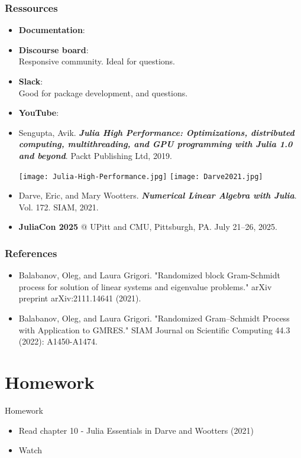 \documentclass[t,usepdftitle=false]{beamer}
\begin{document}
\begin{frame}
\frametitle{Ressources}
\begin{itemize}
\item \textbf{Documentation}: \href{docs.julialang.org}{\color{blue}{docs.julialang.org}}
\item \textbf{Discourse board}: \href{discourse.julialang.org}{\color{blue}{discourse.julialang.org}}\\
\hspace{3.1cm}Responsive community. Ideal for questions.
\item \textbf{Slack}: \href{julialang.slack.com}{\color{blue}{julialang.slack.com}}\\
\hspace{1.2cm}Good for package development, and questions.
\item \textbf{YouTube}: \href{www.youtube.com/c/TheJuliaLanguage}{\color{blue}{www.youtube.com/c/TheJuliaLanguage}}
\item Sengupta, Avik. \textit{\textbf{Julia High Performance: Optimizations, distributed computing,
multithreading, and GPU programming with Julia 1.0 and beyond}}. Packt Publishing Ltd,
2019.\vspace{.1cm}
\begin{center}
\raisebox{.75cm}{My favorite}\hspace{.2cm}
\texttt{[image: Julia-High-Performance.jpg]}
\hspace{1cm}
\texttt{[image: Darve2021.jpg]}
\hspace{.2cm}\raisebox{.75cm}{Used at Stanford}
\end{center}
\item Darve, Eric, and Mary Wootters. \textit{\textbf{Numerical Linear Algebra with Julia}}. Vol. 172. SIAM,
2021.
\item \textbf{JuliaCon 2025} @ UPitt and CMU, Pittsburgh, PA. July 21–26, 2025.
\end{itemize}
\end{frame}

\begin{frame}
\frametitle{References}
\scriptsize
\begin{itemize}
\item Balabanov, Oleg, and Laura Grigori. "Randomized block Gram-Schmidt process for solution of linear systems and eigenvalue problems." arXiv preprint arXiv:2111.14641 (2021).
\item Balabanov, Oleg, and Laura Grigori. "Randomized Gram--Schmidt Process with Application to GMRES." SIAM Journal on Scientific Computing 44.3 (2022): A1450-A1474.
\end{itemize}
\end{frame}


\section{Homework}
\begin{frame}{Homework}
\begin{itemize}
\item Read chapter 10 - Julia Essentials in Darve and Wootters (2021)
\item Watch \href{https://www.youtube.com/watch?v=37L1OMk_3FU}{\color{blue}{Julia Lightning Round on YouTube}}
\end{itemize}
\end{frame}
	
	
	
	
	
\end{document}
